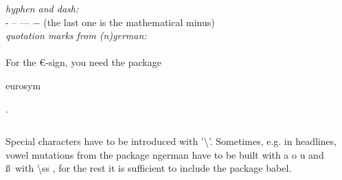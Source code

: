 \begin{frame}
\begin{columns}
\begin{column}{0.5\textwidth}
\textit{hyphen and dash:} \\
- -- --- $-$ (the last one is the mathematical minus) \\

\textit{quotation marks from (n)german:} \\
\glqq \grqq \flqq \frqq\\[5mm]
For the \euro -sign, you need the package \begin{ttfamily}eurosym\end{ttfamily}.\\

\end{column}
\end{columns}
\medskip
\footnotesize Special characters have to be introduced with '\color{nounibaredI}\textbackslash \color{black}'.
Sometimes, e.g. in headlines, vowel mutations from the package ngerman  have to be built with \grqq a \grqq o
\grqq u and \ss ~with \color{nounibaredI} \textbackslash ss \color{black}, for the rest it is sufficient to include the package {\ttfamily babel}.
\end{frame}

